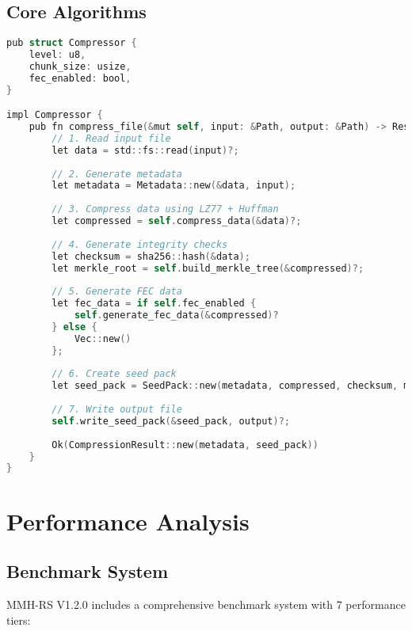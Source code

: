\documentclass[12pt,a4paper]{article}
\begin{document}
\subsection{Core Algorithms}
\begin{lstlisting}[language=C, caption=Core Compression Algorithm]
pub struct Compressor {
    level: u8,
    chunk_size: usize,
    fec_enabled: bool,
}

impl Compressor {
    pub fn compress_file(&mut self, input: &Path, output: &Path) -> Result<CompressionResult> {
        // 1. Read input file
        let data = std::fs::read(input)?;
        
        // 2. Generate metadata
        let metadata = Metadata::new(&data, input);
        
        // 3. Compress data using LZ77 + Huffman
        let compressed = self.compress_data(&data)?;
        
        // 4. Generate integrity checks
        let checksum = sha256::hash(&data);
        let merkle_root = self.build_merkle_tree(&compressed)?;
        
        // 5. Generate FEC data
        let fec_data = if self.fec_enabled {
            self.generate_fec_data(&compressed)?
        } else {
            Vec::new()
        };
        
        // 6. Create seed pack
        let seed_pack = SeedPack::new(metadata, compressed, checksum, merkle_root, fec_data);
        
        // 7. Write output file
        self.write_seed_pack(&seed_pack, output)?;
        
        Ok(CompressionResult::new(metadata, seed_pack))
    }
}
\end{lstlisting}

\newpage

\section{Performance Analysis}

\subsection{Benchmark System}
MMH-RS V1.2.0 includes a comprehensive benchmark system with 7 performance tiers:
\end{document}
